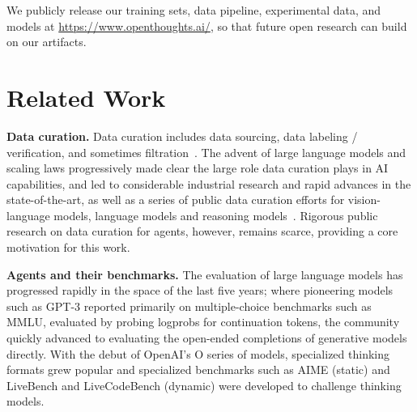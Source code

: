 \documentclass{article}
\begin{document}
We publicly release our training sets, data pipeline, experimental data, and models at \url{https://www.openthoughts.ai/}, so that future open research can build on our artifacts.


\vspace{-0.25cm}
\section{Related Work}
\label{sec:related}

\textbf{Data curation.} Data curation includes data sourcing, data labeling / verification, and sometimes filtration~\citep{gadre2023datacompsearchgenerationmultimodal,li2025datacomplmsearchgenerationtraining}. The advent of large language models and scaling laws progressively made clear the large role data curation plays in AI capabilities, and led to considerable industrial research and rapid advances in the state-of-the-art, as well as a series of public data curation efforts for vision-language models, language models and reasoning models~\citep{gadre2023datacompsearchgenerationmultimodal,li2025datacomplmsearchgenerationtraining,guha2025openthoughtsdatarecipesreasoning,bercovich2025llamanemotronefficientreasoningmodels}. Rigorous public research on data curation for agents, however, remains scarce, providing a core motivation for this work.

\textbf{Agents and their benchmarks.} The evaluation of large language models has progressed rapidly in the space of the last five years; where pioneering models such as GPT-3 reported primarily on multiple-choice benchmarks such as MMLU, evaluated by probing logprobs for continuation tokens, the community quickly advanced to evaluating the open-ended completions of generative models directly. With the debut of OpenAI's O series of models, specialized thinking formats grew popular and specialized benchmarks such as AIME (static) and LiveBench and LiveCodeBench (dynamic) were developed to challenge thinking models.
\end{document}
